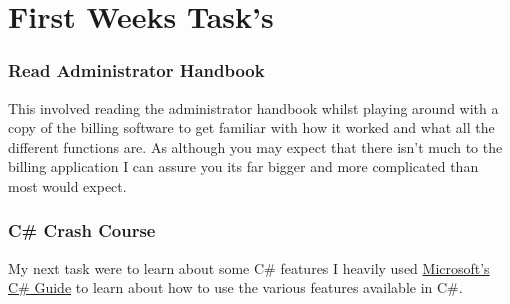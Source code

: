 \section{First Weeks Task's}{
	\subsubsection*{Read Administrator Handbook}{
		This involved reading the administrator handbook whilst playing around with a copy of the billing software to get familiar with how it worked and what all the different functions are. As although you may expect that there isn't much to the billing application I can assure you its far bigger and more complicated than most would expect.
	}
	\subsubsection*{C\# Crash Course}{
		My next task were to learn about some C\# features I heavily used \href{https://docs.microsoft.com/en-gb/dotnet/csharp/programming-guide/}{Microsoft's C\# Guide}\cite{CSProgrammingGuide2017} to learn about how to use the various features available in C\#.
	}
}
